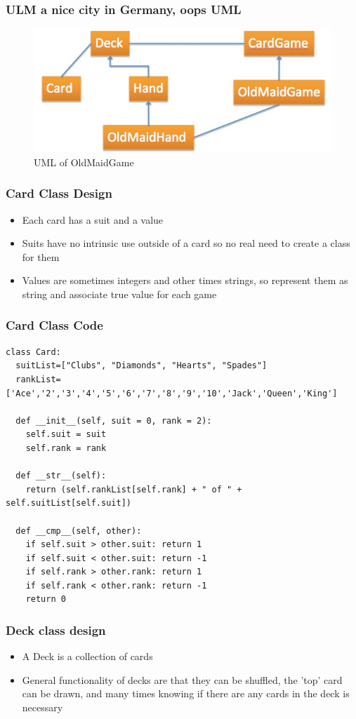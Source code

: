 \documentclass{beamer}
\newcommand\Fontviii{\fontsize{8}{9}\selectfont}
\begin{document}
\begin{frame}[fragile]
\frametitle{ULM a nice city in Germany, oops UML}
\begin{figure}
\includegraphics[scale=0.45]{ulm_uml.jpg} 
\caption{UML of OldMaidGame}
\end{figure}
\end{frame}

\begin{frame}[fragile]
\frametitle{Card Class Design}
\begin{itemize}
\item Each card has a suit and a value
\item Suits have no intrinsic use outside of a card so no real need to create a class for them
\item Values are sometimes integers and other times strings, so represent them as string and associate true value for each game
\end{itemize} 
\end{frame}

\begin{frame}[fragile]
\frametitle{Card Class Code}
\Fontviii
\begin{lstlisting}
class Card:
  suitList=["Clubs", "Diamonds", "Hearts", "Spades"]
  rankList=['Ace','2','3','4','5','6','7','8','9','10','Jack','Queen','King']

  def __init__(self, suit = 0, rank = 2):
    self.suit = suit
    self.rank = rank

  def __str__(self):
    return (self.rankList[self.rank] + " of " + self.suitList[self.suit])

  def __cmp__(self, other):
	if self.suit > other.suit: return 1
    if self.suit < other.suit: return -1
	if self.rank > other.rank: return 1
    if self.rank < other.rank: return -1
	return 0
\end{lstlisting}
\end{frame}

\begin{frame}[fragile]
\frametitle{Deck class design}
\begin{itemize}
\item A Deck is a collection of cards
\item General functionality of decks are that they can be shuffled, the 'top' card can be drawn, and many times knowing if there are any cards in the deck is necessary 
\end{itemize} 
\end{frame}
\end{document}
